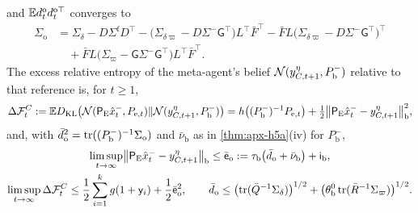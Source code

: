 \begin{theorem}
\begin{enumerate}
\begin{equation}
\end{equation}
and $\mathbb{E} d^{\mathrm o}_td^{\mathrm o\top}_t$ converges to
\begin{equation}\label{eq:apx-blanket-drive}
\begin{aligned}
\Sigma_{\mathrm o}&=\Sigma_\delta-D\Sigma^{\mathrm f}D^\top-\bigl(\Sigma_{\delta\varpi}-D\Sigma^-\mathsf G^\top\bigr)L^\top\bar F^\top-\bar FL\bigl(\Sigma_{\delta\varpi}-D\Sigma^-\mathsf G^\top\bigr)^\top\\
&\quad+\bar FL\bigl(\Sigma_\varpi-\mathsf G\Sigma^-\mathsf G^\top\bigr)L^\top\bar F^\top .
\end{aligned}
\end{equation}
The excess relative entropy of the meta-agent's belief $\mathcal{N}(y^\eta_{C,t+1},P^-_{\mathrm b})$ relative to that reference is, for $t\ge1$,
\begin{equation}\label{eq:apx-blanket-split}
\Delta\mathcal F^C_t:=\mathbb{E}D_{\mathrm{KL}}\bigl(\mathcal{N}(\mathsf P_{\mathrm E}\hat x^-_t,P_{\mathrm e,t})\Vert\mathcal{N}(y^\eta_{C,t+1},P^-_{\mathrm b})\bigr)=h\bigl((P^-_{\mathrm b})^{-1}P_{\mathrm e,t}\bigr)+\tfrac12\bigl\Vert\mathsf P_{\mathrm E}\hat x^-_t-y^\eta_{C,t+1}\bigr\Vert_{\mathrm b}^2,
\end{equation}
and, with $\bar d_{\mathrm o}^2=\operatorname{tr}((P^-_{\mathrm b})^{-1}\Sigma_{\mathrm o})$ and $\bar\nu_{\mathrm b}$ as in \cref{thm:apx-h5a}(iv) for $P^-_{\mathrm b}$,
\begin{equation}\label{eq:apx-blanket-bound}
\begin{gathered}
\limsup_{t\to\infty}\bigl\Vert\mathsf P_{\mathrm E}\hat x^-_t-y^\eta_{C,t+1}\bigr\Vert_{\mathrm b}\le\bar{\mathsf e}_{\mathrm o}:=\tau_{\mathrm b}\bigl(\bar d_{\mathrm o}+\bar\nu_{\mathrm b}\bigr)+\mathsf i_{\mathrm b},\\
\limsup_{t\to\infty}\Delta\mathcal F^C_t\le\frac12\sum_{i=1}^kg(1+\mathsf y_i)+\frac12\bar{\mathsf e}_{\mathrm o}^2,\qquad\bar d_{\mathrm o}\le\bigl(\operatorname{tr}(\bar Q^{-1}\Sigma_\delta)\bigr)^{1/2}+\bigl(\theta^0_{\mathrm b}\operatorname{tr}(\bar R^{-1}\Sigma_\varpi)\bigr)^{1/2} .
\end{gathered}
\end{equation}

\end{enumerate}
\end{theorem}
